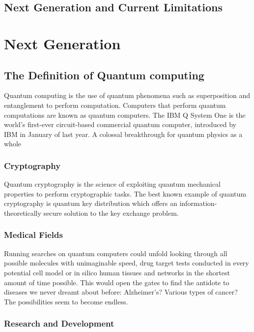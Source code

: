 \documentclass[journal]{IEEEtran}
\begin{document}
\subsection{Next  Generation and Current Limitations} \label{subsec:Bits}


\section{Next Generation}


\subsection{The Definition of 	Quantum computing} \label{subsec:def5g}
Quantum computing is the use of quantum phenomena such as superposition and entanglement to perform computation. Computers that perform quantum computations are known as quantum computers. The IBM Q System One  is the world's first-ever circuit-based commercial quantum computer, introduced by IBM in January of last year.  A colossal breakthrough for quantum physics as a whole 

\subsubsection{Cryptography}
Quantum cryptography is the science of exploiting quantum mechanical properties to perform cryptographic tasks. The best known example of quantum cryptography is quantum key distribution which offers an information-theoretically secure solution to the key exchange problem. 


\subsubsection{Medical Fields}


Running searches on quantum computers could unfold looking through all possible molecules with unimaginable speed, drug target tests conducted in every potential cell model or in silico human tissues and networks in the shortest amount of time possible. This would open the gates to find the antidote to diseases we never dreamt about before: Alzheimer’s? Various types of cancer? The possibilities seem to become endless.


\subsubsection{Research and Development }
\end{document}
